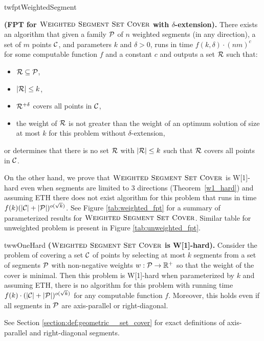 \begin{restatable}{tw}{fptWeightedSegment}{
	\label{fpt_weighted_segment}
	\textbf{(FPT for $\textsc{Weighted Segment Set Cover}$ with $\delta$-extension).}
	There exists an algorithm that given a family $\mathcal{P}$ of
	$n$ weighted segments (in any direction),
	a set of $m$ points $\mathcal{C}$, and parameters $k$ and $\delta > 0$,
	runs in time $f(k, \delta) \cdot (nm)^c$ for some computable function $f$ and a constant $c$ and
	outputs a set $\mathcal{R}$ such that:
	\begin{itemize}
	\item $\mathcal{R} \subseteq \mathcal{P}$,
	\item $|\mathcal{R}| \le k$,
	\item $\mathcal{R}^{+\delta}$ covers all points in $\mathcal{C}$,
	\item the weight of $\mathcal{R}$ is not greater than the weight
	of an optimum solution of size at most $k$
	for this problem without $\delta$-extension,
	\end{itemize}
	or determines that there is no set $\mathcal{R}$ with $|\mathcal{R}| \le k$
	such that $\mathcal{R}$ covers all points in $\mathcal{C}$.
}\end{restatable}

On the other hand, we prove that $\textsc{Weighted Segment Set Cover}$ 
is W[1]-hard even when segments are limited to 3 directions (Theorem~\ref{w1_hard})
and assuming ETH there does not exist algorithm for this problem
that runs in time ${f(k)(|\mathcal{C}| + |\mathcal{P}|)^{o(\sqrt{k})}}$.
See Figure \ref{tab:weighted_fpt} for a summary of parameterized
results for $\textsc{Weighted Segment Set Cover}$.
Similar table for unweighted problem is present in Figure \ref{tab:unweighted_fpt}.

\begin{restatable}{tw}{wOneHard}
\label{w1_hard}
	\textbf{($\textsc{Weighted Segment Set Cover}$ is W[1]-hard).}
	Consider the problem of covering a set $\mathcal{C}$ of points
	by selecting at most $k$ segments
	from a set of segments $\mathcal{P}$ 
	with non-negative weights $w : \mathcal{P} \rightarrow \mathbb{R^+}$
	so that the weight of the cover is minimal.
	Then this problem is W[1]-hard when parameterized by $k$ and
	assuming ETH, there is no algorithm for this
	problem with running time
	$f(k)\cdot(|\mathcal{C}| + |\mathcal{P}|)^{o(\sqrt{k})}$
	for any computable function $f$.
	Moreover, this holds even if all segments in $\mathcal{P}$
	are axis-parallel or right-diagonal.
\end{restatable}

See Section \ref{section:def:geometric__set_cover}
for exact definitions of axis-parallel and right-diagonal segments.

